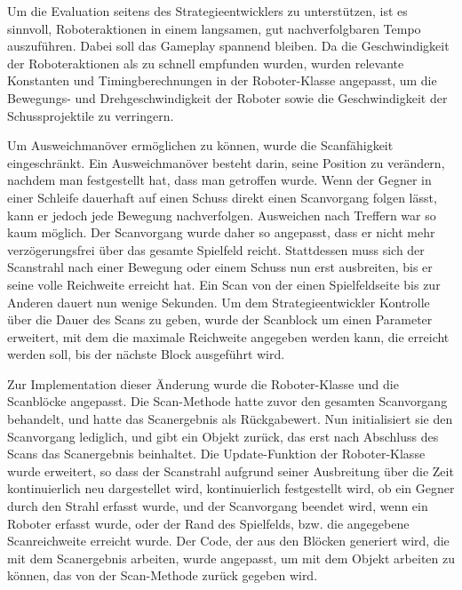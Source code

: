 Um die Evaluation seitens des Strategieentwicklers zu unterstützen, ist es sinnvoll, Roboteraktionen
in einem langsamen, gut nachverfolgbaren Tempo auszuführen. Dabei soll das Gameplay spannend
bleiben. Da die Geschwindigkeit der Roboteraktionen als zu schnell empfunden wurden, wurden
relevante Konstanten und Timingberechnungen in der Roboter-Klasse angepasst, um die Bewegungs- und
Drehgeschwindigkeit der Roboter sowie die Geschwindigkeit der Schussprojektile zu verringern.

Um Ausweichmanöver ermöglichen zu können, wurde die Scanfähigkeit eingeschränkt. Ein Ausweichmanöver
besteht darin, seine Position zu verändern, nachdem man festgestellt hat, dass man getroffen wurde.
Wenn der Gegner in einer Schleife dauerhaft auf einen Schuss direkt einen Scanvorgang folgen lässt,
kann er jedoch jede Bewegung nachverfolgen. Ausweichen nach Treffern war so kaum möglich. Der
Scanvorgang wurde daher so angepasst, dass er nicht mehr verzögerungsfrei über das gesamte
Spielfeld reicht. Stattdessen muss sich der Scanstrahl nach einer Bewegung oder einem Schuss nun
erst ausbreiten, bis er seine volle Reichweite erreicht hat. Ein Scan von der einen Spielfeldseite
bis zur Anderen dauert nun wenige Sekunden. Um dem Strategieentwickler Kontrolle über die Dauer des Scans
zu geben, wurde der Scanblock um einen Parameter erweitert, mit dem die maximale Reichweite
angegeben werden kann, die erreicht werden soll, bis der nächste Block ausgeführt wird.

Zur Implementation dieser Änderung wurde die Roboter-Klasse und die Scanblöcke angepasst. Die
Scan-Methode hatte zuvor den gesamten Scanvorgang behandelt, und hatte das Scanergebnis als
Rückgabewert. Nun initialisiert sie den Scanvorgang lediglich, und gibt ein Objekt zurück, das erst
nach Abschluss des Scans das Scanergebnis beinhaltet. Die Update-Funktion der Roboter-Klasse wurde
erweitert, so dass der Scanstrahl aufgrund seiner Ausbreitung über die Zeit kontinuierlich neu
dargestellet wird, kontinuierlich festgestellt wird, ob ein Gegner durch den Strahl erfasst wurde,
und der Scanvorgang beendet wird, wenn ein Roboter erfasst wurde, oder der Rand des Spielfelds, bzw.
die angegebene Scanreichweite erreicht wurde. Der Code, der aus den Blöcken generiert wird, die mit
dem Scanergebnis arbeiten, wurde angepasst, um mit dem Objekt arbeiten zu können, das von der
Scan-Methode zurück gegeben wird.
